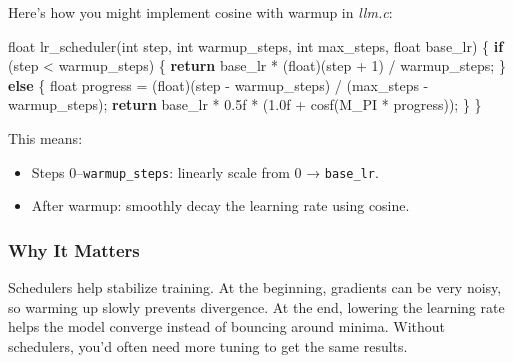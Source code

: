 \documentclass[
  letterpaper,
  DIV=11,
  numbers=noendperiod]{scrreprt}
\newenvironment{Shaded}{\begin{snugshade}}{\end{snugshade}}
\newcommand{\BuiltInTok}[1]{\textcolor[rgb]{0.00,0.23,0.31}{#1}}
\newcommand{\ControlFlowTok}[1]{\textcolor[rgb]{0.00,0.23,0.31}{\textbf{#1}}}
\newcommand{\DataTypeTok}[1]{\textcolor[rgb]{0.68,0.00,0.00}{#1}}
\newcommand{\DecValTok}[1]{\textcolor[rgb]{0.68,0.00,0.00}{#1}}
\newcommand{\FloatTok}[1]{\textcolor[rgb]{0.68,0.00,0.00}{#1}}
\newcommand{\NormalTok}[1]{\textcolor[rgb]{0.00,0.23,0.31}{#1}}
\newcommand{\OperatorTok}[1]{\textcolor[rgb]{0.37,0.37,0.37}{#1}}
\providecommand{\tightlist}{%
  \setlength{\itemsep}{0pt}\setlength{\parskip}{0pt}}
\begin{document}
Here's how you might implement cosine with warmup in \emph{llm.c}:

\begin{Shaded}
\begin{Highlighting}[]
\DataTypeTok{float}\NormalTok{ lr\_scheduler}\OperatorTok{(}\DataTypeTok{int}\NormalTok{ step}\OperatorTok{,} \DataTypeTok{int}\NormalTok{ warmup\_steps}\OperatorTok{,} \DataTypeTok{int}\NormalTok{ max\_steps}\OperatorTok{,} \DataTypeTok{float}\NormalTok{ base\_lr}\OperatorTok{)} \OperatorTok{\{}
    \ControlFlowTok{if} \OperatorTok{(}\NormalTok{step }\OperatorTok{\textless{}}\NormalTok{ warmup\_steps}\OperatorTok{)} \OperatorTok{\{}
        \ControlFlowTok{return}\NormalTok{ base\_lr }\OperatorTok{*} \OperatorTok{(}\DataTypeTok{float}\OperatorTok{)(}\NormalTok{step }\OperatorTok{+} \DecValTok{1}\OperatorTok{)} \OperatorTok{/}\NormalTok{ warmup\_steps}\OperatorTok{;}
    \OperatorTok{\}} \ControlFlowTok{else} \OperatorTok{\{}
        \DataTypeTok{float}\NormalTok{ progress }\OperatorTok{=} \OperatorTok{(}\DataTypeTok{float}\OperatorTok{)(}\NormalTok{step }\OperatorTok{{-}}\NormalTok{ warmup\_steps}\OperatorTok{)} \OperatorTok{/} \OperatorTok{(}\NormalTok{max\_steps }\OperatorTok{{-}}\NormalTok{ warmup\_steps}\OperatorTok{);}
        \ControlFlowTok{return}\NormalTok{ base\_lr }\OperatorTok{*} \FloatTok{0.5}\BuiltInTok{f} \OperatorTok{*} \OperatorTok{(}\FloatTok{1.0}\BuiltInTok{f} \OperatorTok{+}\NormalTok{ cosf}\OperatorTok{(}\NormalTok{M\_PI }\OperatorTok{*}\NormalTok{ progress}\OperatorTok{));}
    \OperatorTok{\}}
\OperatorTok{\}}
\end{Highlighting}
\end{Shaded}

This means:

\begin{itemize}
\tightlist
\item
  Steps 0--\texttt{warmup\_steps}: linearly scale from 0 →
  \texttt{base\_lr}.
\item
  After warmup: smoothly decay the learning rate using cosine.
\end{itemize}

\subsubsection{Why It Matters}\label{why-it-matters-58}

Schedulers help stabilize training. At the beginning, gradients can be
very noisy, so warming up slowly prevents divergence. At the end,
lowering the learning rate helps the model converge instead of bouncing
around minima. Without schedulers, you'd often need more tuning to get
the same results.
\end{document}
